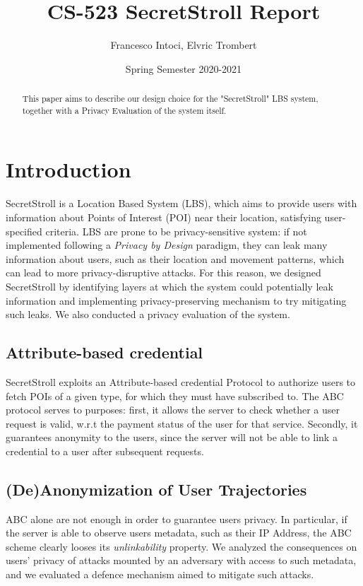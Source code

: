 \documentclass[10pt,conference,compsocconf]{IEEEtran}
\title{CS-523 SecretStroll Report}
\author{Francesco Intoci, Elvric Trombert}
\date{Spring Semester 2020-2021}
\begin{document}
\maketitle

\begin{abstract}
    This paper aims to describe our design choice for the "SecretStroll" LBS system, together with a Privacy Evaluation of the system itself.
\end{abstract}

\section{Introduction}
SecretStroll is a Location Based System (LBS), which aims to provide users with
information about Points of Interest (POI) near their location, satisfying
user-specified criteria.\newline
LBS are prone to be privacy-sensitive system: if not implemented following a
\textit{Privacy by Design} paradigm, they can leak many information about users,
such as their location and movement patterns, which can lead to more
privacy-disruptive attacks. For this reason, we designed SecretStroll
by identifying layers at which the system could potentially leak information and
implementing privacy-preserving mechanism to try mitigating such leaks. We also conducted a privacy evaluation of the system.\newline
\subsection{Attribute-based credential}
SecretStroll exploits an Attribute-based credential Protocol to authorize users
to fetch POIs of a given type, for which they must have subscribed to. The ABC protocol serves to purposes:
first, it allows the server to check whether a user request is valid, w.r.t the payment status of the
user for that service. Secondly, it guarantees anonymity to the users, since the server will not be able
to link a credential to a user after subsequent requests.
\subsection{(De)Anonymization of User Trajectories}
ABC alone are not enough in order to guarantee users privacy. In particular, if the server is
able to observe users metadata, such as their IP Address, the ABC scheme clearly looses its
\textit{unlinkability} property. We analyzed the consequences on users' privacy of attacks
mounted by an adversary with access to such metadata, and we evaluated a defence mechanism aimed to mitigate
such attacks.
\end{document}
